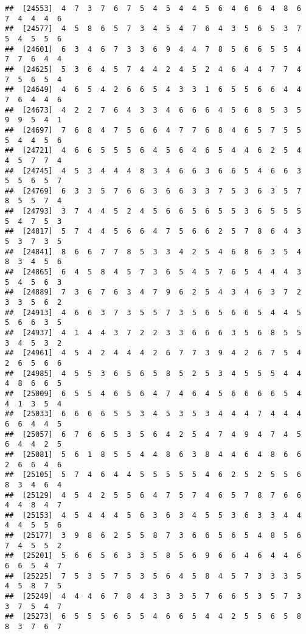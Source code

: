 \documentclass[
]{book}
\begin{document}
\begin{verbatim}
##  [24553]  4  7  3  7  6  7  5  4  5  4  4  5  6  4  6  6  4  8  6  7  4  4  4  6
##  [24577]  4  5  8  6  5  7  3  4  5  4  7  6  4  3  5  6  5  3  7  5  4  5  5  6
##  [24601]  6  3  4  6  7  3  3  6  9  4  4  7  8  5  6  6  5  5  4  7  7  6  4  4
##  [24625]  5  3  6  4  5  7  4  4  2  4  5  2  4  6  4  4  7  7  4  7  5  6  5  4
##  [24649]  4  6  5  4  2  6  6  5  4  3  3  1  6  5  5  6  6  4  4  7  6  4  4  6
##  [24673]  4  2  2  7  6  4  3  3  4  6  6  6  4  5  6  8  5  3  5  9  9  5  4  1
##  [24697]  7  6  8  4  7  5  6  6  4  7  7  6  8  4  6  5  7  5  5  5  4  4  5  6
##  [24721]  4  6  6  5  5  5  6  4  5  6  4  6  5  4  4  6  2  5  4  4  5  7  7  4
##  [24745]  4  5  3  4  4  4  8  3  4  6  6  3  6  6  5  4  6  6  3  5  5  6  5  7
##  [24769]  6  3  3  5  7  6  6  3  6  6  3  3  7  5  3  6  3  5  7  8  5  5  7  4
##  [24793]  3  7  4  4  5  2  4  5  6  6  5  6  5  5  3  6  5  5  5  5  4  7  5  3
##  [24817]  5  7  4  4  5  6  6  4  7  5  6  6  2  5  7  8  6  4  3  5  3  7  3  5
##  [24841]  8  6  6  7  7  8  5  3  3  4  2  5  4  6  8  6  3  5  4  8  3  4  5  6
##  [24865]  6  4  5  8  4  5  7  3  6  5  4  5  7  6  5  4  4  4  3  5  4  5  6  3
##  [24889]  7  3  6  7  6  3  4  7  9  6  2  5  4  3  4  6  3  7  2  3  3  5  6  2
##  [24913]  4  6  6  3  7  3  5  5  7  3  5  6  5  6  6  5  4  4  5  5  6  6  3  5
##  [24937]  4  1  4  4  3  7  2  2  3  3  6  6  6  3  5  6  8  5  5  3  4  5  3  2
##  [24961]  4  5  4  2  4  4  4  2  6  7  7  3  9  4  2  6  7  5  4  2  6  5  6  6
##  [24985]  4  5  5  3  6  5  6  5  8  5  2  5  3  4  5  5  5  4  4  4  8  6  6  5
##  [25009]  6  5  5  4  6  5  6  4  7  4  6  4  5  6  6  6  6  5  4  4  1  3  5  4
##  [25033]  6  6  6  6  5  5  3  4  5  3  5  3  4  4  4  7  4  4  4  6  6  4  4  5
##  [25057]  6  7  6  6  5  3  5  6  4  2  5  4  7  4  9  4  7  4  5  6  4  4  2  5
##  [25081]  5  6  1  8  5  5  4  4  8  6  3  8  4  4  6  4  8  6  6  2  6  6  4  6
##  [25105]  5  7  4  6  4  4  5  5  5  5  5  4  6  2  5  2  5  5  6  8  3  4  6  4
##  [25129]  4  5  4  2  5  5  6  4  7  5  7  4  6  5  7  8  7  6  6  4  4  8  4  7
##  [25153]  4  5  4  4  4  5  6  3  6  3  4  5  5  3  6  3  3  4  4  4  4  5  5  6
##  [25177]  3  9  8  6  2  5  5  8  7  3  6  6  5  6  5  4  8  5  6  7  4  5  5  2
##  [25201]  5  6  6  5  6  3  3  5  8  5  6  9  6  6  4  6  4  4  6  6  6  5  4  7
##  [25225]  7  5  3  5  7  5  3  5  6  4  5  8  4  5  7  3  3  3  5  4  5  8  7  5
##  [25249]  4  4  4  6  7  8  4  3  3  3  5  7  6  6  5  3  5  7  3  3  7  5  4  7
##  [25273]  6  5  5  5  6  5  5  4  6  6  5  4  4  2  5  5  6  5  8  8  3  7  6  7

\end{verbatim}
\end{document}
